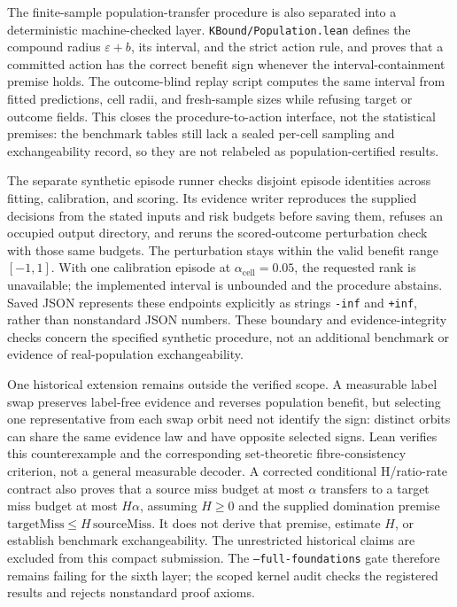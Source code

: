 The finite-sample population-transfer procedure is also separated into a deterministic
machine-checked layer. \texttt{KBound/Population.lean} defines the compound radius
$\varepsilon+b$, its interval, and the strict action rule, and proves that a committed
action has the correct benefit sign whenever the interval-containment premise holds.
The outcome-blind replay script  computes the
same interval from fitted predictions, cell radii, and fresh-sample sizes while refusing
target or outcome fields. This closes the procedure-to-action interface, not the
statistical premises: the benchmark tables still lack a sealed per-cell sampling and
exchangeability record, so they are not relabeled as population-certified results.

The separate synthetic episode runner 
checks disjoint episode identities across fitting, calibration, and scoring. Its evidence
writer reproduces the supplied decisions from the stated inputs and risk budgets before
saving them, refuses an occupied output directory, and reruns the scored-outcome
perturbation check with those same budgets. The perturbation stays within the valid
benefit range $[-1,1]$. With one calibration episode at $\alpha_{\mathrm{cell}}=0.05$,
the requested rank is unavailable; the implemented interval is unbounded and the
procedure abstains. Saved JSON represents these endpoints explicitly as strings
\texttt{-inf} and \texttt{+inf}, rather than nonstandard JSON numbers. These boundary
and evidence-integrity checks concern the specified synthetic procedure, not an
additional benchmark or evidence of real-population exchangeability.

One historical extension remains outside the verified scope. A measurable label swap preserves
label-free evidence and reverses population benefit, but selecting one representative from each
swap orbit need not identify the sign: distinct orbits can share the same evidence law and have
opposite selected signs. Lean verifies this counterexample and the corresponding set-theoretic
fibre-consistency criterion, not a general measurable decoder. A corrected conditional
H/ratio-rate contract also proves that a source miss budget at most $\alpha$ transfers to
a target miss budget at most $H\alpha$, assuming $H\geq0$ and the supplied domination
premise $\mathrm{targetMiss}\leq H\,\mathrm{sourceMiss}$. It does not derive that premise,
estimate $H$, or establish benchmark exchangeability. The unrestricted historical
claims are excluded from this compact submission. The
\texttt{--full-foundations} gate therefore remains failing for the sixth layer; the scoped
kernel audit checks the registered results and rejects nonstandard proof axioms.

